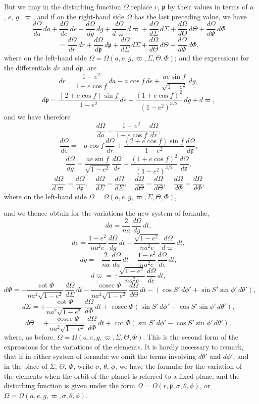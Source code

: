 \documentclass[11pt]{article}
\begin{document}
\medskip
\noindent But we may in the disturbing function $\Omega$ replace $r$, $\mathfrak{p}$ by their values in terms of $a$, $e$, $g$, $\varpi$, and if on the right-hand side $\Omega$ has the last preceding value, we have
\[
\frac{d\Omega}{da}\,da + \frac{d\Omega}{de}\,de + \frac{d\Omega}{dg}\,dg + \frac{d\Omega}{d\varpi}\,d\varpi + \frac{d\Omega}{d\Sigma}\,d\Sigma + \frac{d\Omega}{d\Theta}\,d\Theta + \frac{d\Omega}{d\Phi}\,d\Phi
\]
\[
= \frac{d\Omega}{dr}\,dr + \frac{d\Omega}{d\mathfrak{p}}\,d\mathfrak{p} + \frac{d\Omega}{d\Sigma}\,d\Sigma + \frac{d\Omega}{d\Theta}\,d\Theta + \frac{d\Omega}{d\Phi}\,d\Phi,
\]
where on the left-hand side $\Omega = \Omega(a,e,g,\varpi,\Sigma,\Theta,\Phi)$; and the expressions for the differentials $dr$ and $d\mathfrak{p}$, are
\[
dr = \frac{1-e^{2}}{1+e\cos f}\,da - a\cos f\,de + \frac{ae\sin f}{\sqrt{1-e^{2}}}\,dg,
\]
\[
d\mathfrak{p} = \frac{(2+e\cos f)\sin f}{1-e^{2}}\,de + \frac{(1+e\cos f)^{2}}{(1-e^{2})^{3/2}}\,dg + d\varpi,
\]
and we have therefore
\[
\frac{d\Omega}{da} = \frac{1-e^{2}}{1+e\cos f}\,\frac{d\Omega}{dr},
\]
\[
\frac{d\Omega}{de} = -a\cos f\,\frac{d\Omega}{dr} + \frac{(2+e\cos f)\sin f}{1-e^{2}}\,\frac{d\Omega}{d\mathfrak{p}},
\]
\[
\frac{d\Omega}{dg} = \frac{ae\sin f}{\sqrt{1-e^{2}}}\,\frac{d\Omega}{dr} + \frac{(1+e\cos f)^{2}}{(1-e^{2})^{3/2}}\,\frac{d\Omega}{d\mathfrak{p}},
\]
\[
\frac{d\Omega}{d\varpi} = \frac{d\Omega}{d\mathfrak{p}},\quad \frac{d\Omega}{d\Sigma} = \frac{d\Omega}{d\Sigma},\quad \frac{d\Omega}{d\Theta} = \frac{d\Omega}{d\Theta},\quad \frac{d\Omega}{d\Phi} = \frac{d\Omega}{d\Phi},
\]
where on the left-hand side $\Omega = \Omega(a,e,g,\varpi,\Sigma,\Theta,\Phi)$,

\bigskip
{} and we thence obtain for the variations the new system of formul\ae{},
\[
da = \frac{2}{na}\,\frac{d\Omega}{dg}\,dt,
\]
\[
de = \frac{1-e^{2}}{na^{2}e}\,\frac{d\Omega}{dg}\,dt - \frac{\sqrt{1-e^{2}}}{na^{2}e}\,\frac{d\Omega}{d\varpi}\,dt,
\]
\[
dg = -\frac{2}{na}\,\frac{d\Omega}{da}\,dt - \frac{1-e^{2}}{na^{2}e}\,\frac{d\Omega}{de}\,dt,
\]
\[
d\varpi = +\frac{\sqrt{1-e^{2}}}{na^{2}e}\,\frac{d\Omega}{de}\,dt,
\]
\[
d\Phi = -\frac{\cot\Phi}{na^{2}\sqrt{1-e^{2}}}\,\frac{d\Omega}{d\Sigma}\,dt - \frac{\operatorname{cosec}\Phi}{na^{2}\sqrt{1-e^{2}}}\,\frac{d\Omega}{d\Theta}\,dt - (\cos S'\,d\phi' + \sin S'\sin\phi'\,d\theta'),
\]
\[
d\Sigma = +\frac{\cot\Phi}{na^{2}\sqrt{1-e^{2}}}\,\frac{d\Omega}{d\Phi}\,dt + \operatorname{cosec}\Phi(\sin S'\,d\phi' - \cos S'\sin\phi'\,d\theta'),
\]
\[
d\Theta = +\frac{\operatorname{cosec}\Phi}{na^{2}\sqrt{1-e^{2}}}\,\frac{d\Omega}{d\Phi}\,dt + \cot\Phi(\sin S'\,d\phi' - \cos S'\sin\phi'\,d\theta'),
\]
where, as before, $\Omega = \Omega(a,e,g,\varpi,\Sigma,\Theta,\Phi)$. This is the second form of the expressions for the variations of the elements. It is hardly necessary to remark, that if in either system of formul\ae{} we omit the terms involving $d\theta'$ and $d\phi'$, and in the place of $\Sigma$, $\Theta$, $\Phi$, write $\sigma$, $\theta$, $\phi$, we have the formul\ae{} for the variation of the elements when the orbit of the planet is referred to a fixed plane, and the disturbing function is given under the form $\Omega = \Omega(r,\mathfrak{p},\sigma,\theta,\phi)$, or $\Omega = \Omega(a,e,g,\varpi,\sigma,\theta,\phi)$.
\end{document}
